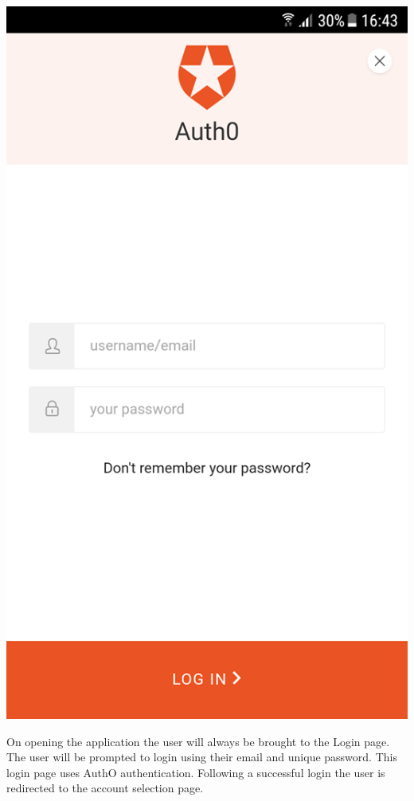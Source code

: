 \begin{center}
    \includegraphics[scale=0.5]{img/1authloginnull.png}
\end{center}
On opening the application the user will always be brought to the Login page. The user will be prompted to login using their email and unique password. This login page uses AuthO authentication. Following a successful login the user is redirected to the account selection page.\paragraph{}

